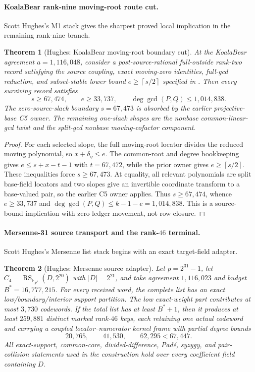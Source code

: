 \documentclass[11pt,a4paper]{amsart}
\numberwithin{equation}{section}
\newtheorem{theorem}{Theorem}[section]
\theoremstyle{remark}
\DeclareMathOperator{\RS}{RS}
\newcommand{\ceil}[1]{\left\lceil#1\right\rceil}
\begin{document}
\paragraph{KoalaBear rank-nine moving-root route cut.}
Scott Hughes's M1 stack gives the sharpest proved local implication in the remaining rank-nine branch.

\begin{theorem}[Hughes: KoalaBear moving-root boundary cut]\label{thm:kb-moving-cut}
At the KoalaBear agreement $a=1{,}116{,}048$, consider a post-source-rational full-outside rank-two record satisfying the source coupling, exact moving-zero identities, full-gcd reduction, and subset-stable lower bound $e\ge\ceil{s/2}$ specified in \cite{HughesKBM126}.  Then every surviving record satisfies
\[
 s\ge67{,}474,\qquad e\ge33{,}737,
 \qquad \deg\gcd(P,Q)\le1{,}014{,}838.
\]
The zero-source-slack boundary $s=67{,}473$ is absorbed by the earlier projective-base C5 owner.  The remaining one-slack shapes are the nonbase common-linear-gcd twist and the split-gcd nonbase moving-cofactor component.
\end{theorem}

\begin{proof}
For each selected slope, the full moving-root locator divides the reduced moving polynomial, so $x+\delta_\eta\le e$.  The common-root and degree bookkeeping gives $e\le s+x-t-1$ with $t=67{,}472$, while the prior owner gives $e\ge\ceil{s/2}$.  These inequalities force $s\ge67{,}473$.  At equality, all relevant polynomials are split base-field locators and two slopes give an invertible coordinate transform to a base-valued pair, so the earlier C5 owner applies.  Thus $s\ge67{,}474$, whence $e\ge33{,}737$ and $\deg\gcd(P,Q)\le k-1-e=1{,}014{,}838$.  This is a source-bound implication with zero ledger movement, not row closure.
\end{proof}

\paragraph{Mersenne-31 source transport and the rank-$46$ terminal.}
Scott Hughes's Mersenne list stack begins with an exact target-field adapter.

\begin{theorem}[Hughes: Mersenne source adapter]\label{thm:m31-source-adapter}
Let $p=2^{31}-1$, let $C_4=\RS_{\mathbb F_{p^4}}(D,2^{20})$ with $|D|=2^{21}$, and take agreement $1{,}116{,}023$ and budget $B^*=16{,}777{,}215$.  For every received word, the complete list has an exact low/boundary/interior support partition.  The low exact-weight part contributes at most $3{,}730$ codewords.  If the total list has at least $B^*+1$, then it produces at least $259{,}881$ distinct marked rank-$46$ keys, each retaining one actual codeword and carrying a coupled locator--numerator kernel frame with partial degree bounds
\[
 20{,}765,\qquad41{,}530,\qquad62{,}295<67{,}447.
\]
All exact-support, common-core, divided-difference, Pad\'e, syzygy, and pair-collision statements used in the construction hold over every coefficient field containing $D$.
\end{theorem}
\end{document}
